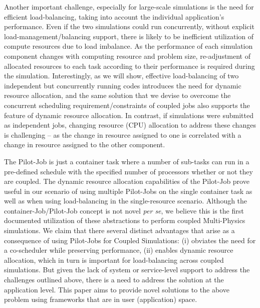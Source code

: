\documentclass[conference,final]{IEEEtran}
\newcommand{\skonote}[1]{ {\textcolor{blue} { ***Jeff: #1 }}}
\newcommand{\athotanote}[1]{ {\textcolor{green} { ***athota: #1 }}}
\newcommand{\skonote}[1]{}
\begin{document}
Another important challenge, especially for large-scale simulations is
the need for efficient load-balancing, taking into account the
individual application's performance. Even if the two simulations could
run concurrently, without explicit load-management/balancing support,
there is likely to be inefficient utilization of compute resources due
to load imbalance. As the performance of each simulation component
changes with computing resource and problem size, re-adjustment of
allocated resources to each task according to their performance is
required during the simulation. Interestingly, as we will show,
effective load-balancing of two independent but concurrently running
codes introduces the need for dynamic resource allocation, and the
same solution that we devise to overcome the concurrent scheduling
requirement/constraints of coupled jobs also supports the feature of
dynamic resource allocation. In contrast, if simulations were
submitted as independent jobs, changing resource (CPU) allocation to
address these changes is challenging -- as the change in resource
assigned to one is correlated with a change in resource assigned to
the other component.

The Pilot-Job is just a container task where a number of sub-tasks can
run in a pre-defined schedule with the specified number of processors
whether or not they are coupled.  The dynamic resource allocation
capabilities of the Pilot-Job prove useful 
in our scenario of using multiple Pilot-Jobs on the single container task
as well as when using load-balancing in the single-resource scenario.
Although the container-Job/Pilot-Job concept is not novel {\it per
  se}, we believe this is the first documented utilization of these
abstractions to perform coupled Multi-Physics simulations. We claim
that there several distinct advantages that arise as a consequence of
using Pilot-Jobs for Coupled Simulations: (i) obviates the need for a
co-scheduler while preserving performance, (ii) enables dynamic
resource allocation, which in turn is important for load-balancing
across coupled simulations.  But given the lack of system or
service-level support to address the challenges outlined above, there
is a need to address the solution at the application level. This paper
aims to provide novel solutions to the above problem using frameworks
that are in user (application) space.
 
\end{document}
